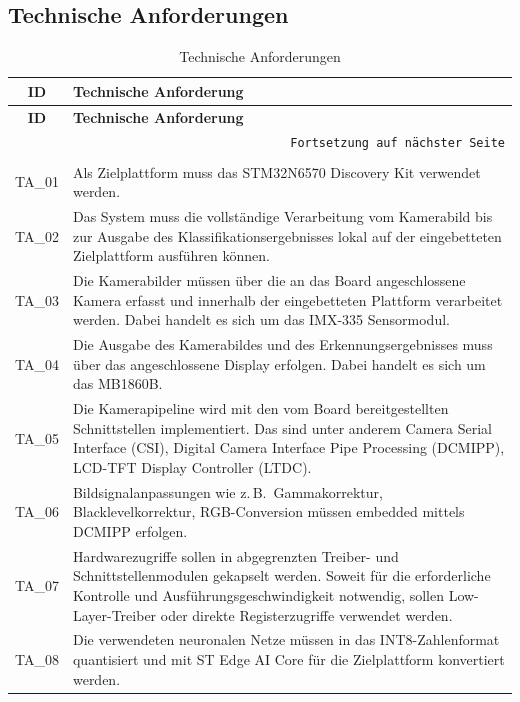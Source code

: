 \subsection{Technische Anforderungen}\label{sub:tech-anforderungen}

\begin{longtable}{|c|p{}|}
    \hline
    \textbf{ID} & \textbf{Technische Anforderung} \\
    \hline
    \endfirsthead
    \hline
    \textbf{ID} & \textbf{Technische Anforderung} \\
    \hline
    \endhead
    \hline
    \multicolumn{2}{r}{\texttt{Fortsetzung auf nächster Seite}} \\
    \endfoot
    \caption{Technische Anforderungen}
    \label{tab:technische-anforderungen} \\
    \endlastfoot
    TA\_01 & Als Zielplattform muss das STM32N6570 Discovery Kit verwendet werden. \\
    \hline
    TA\_02 & Das System muss die vollständige Verarbeitung vom Kamerabild bis zur Ausgabe des Klassifikationsergebnisses lokal auf der eingebetteten Zielplattform ausführen können. \\
    \hline
    TA\_03 & Die Kamerabilder müssen über die an das Board angeschlossene Kamera erfasst und innerhalb der eingebetteten Plattform verarbeitet werden. Dabei handelt es sich um das IMX-335 Sensormodul. \\
    \hline
    TA\_04 & Die Ausgabe des Kamerabildes und des Erkennungsergebnisses muss über das angeschlossene Display erfolgen. Dabei handelt es sich um das MB1860B. \\
    \hline
    TA\_05 & Die Kamerapipeline wird mit den vom Board bereitgestellten Schnittstellen implementiert. Das sind unter anderem Camera Serial Interface (CSI), Digital Camera Interface Pipe Processing (DCMIPP), LCD-TFT Display Controller (LTDC). \\
    \hline
    TA\_06 & Bildsignalanpassungen wie z.\,B.\ Gammakorrektur, Blacklevelkorrektur, RGB-Conversion müssen embedded mittels DCMIPP erfolgen. \\
    \hline
    TA\_07 & Hardwarezugriffe sollen in abgegrenzten Treiber- und Schnittstellenmodulen gekapselt werden. Soweit für die erforderliche Kontrolle und Ausführungsgeschwindigkeit notwendig, sollen Low-Layer-Treiber oder direkte Registerzugriffe verwendet werden. \\
    \hline
    TA\_08 & Die verwendeten neuronalen Netze müssen in das INT8-Zahlenformat quantisiert und mit ST Edge AI Core für die Zielplattform konvertiert werden. \\

\end{longtable}
